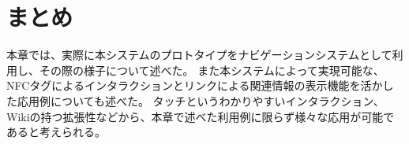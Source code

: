 \section{まとめ}
本章では、実際に本システムのプロトタイプをナビゲーションシステムとして利用し、その際の様子について述べた。
また本システムによって実現可能な、NFCタグによるインタラクションとリンクによる関連情報の表示機能を活かした応用例についても述べた。
タッチというわかりやすいインタラクション、Wikiの持つ拡張性などから、本章で述べた利用例に限らず様々な応用が可能であると考えられる。